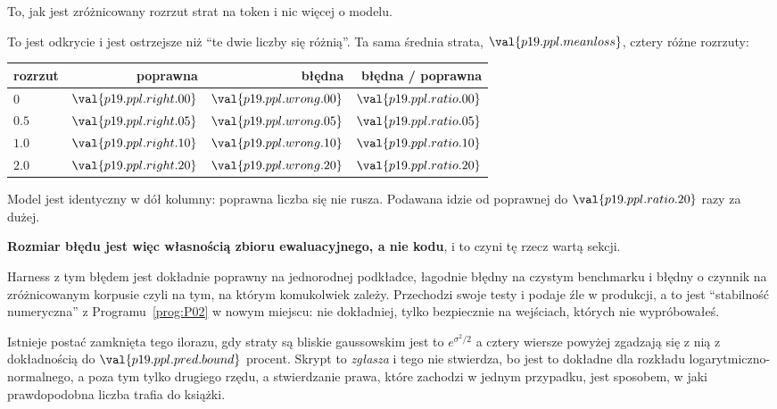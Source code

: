 \begin{fr}
\begin{ansblock}
To, jak jest zróżnicowany \dash{} rozrzut strat na token i nic więcej o
modelu.
\end{ansblock}

To jest odkrycie i jest ostrzejsze niż \enquote{te dwie liczby się różnią}. Ta
sama średnia strata, $\val{p19.ppl.meanloss}$, cztery różne rozrzuty:

\begin{center}
\begin{tabular}{lrrr}
\toprule
rozrzut & poprawna & błędna & błędna / poprawna \\
\midrule
$0$ & $\val{p19.ppl.right.00}$ & $\val{p19.ppl.wrong.00}$ & $\val{p19.ppl.ratio.00}$ \\
$\num{0.5}$ & $\val{p19.ppl.right.05}$ & $\val{p19.ppl.wrong.05}$ & $\val{p19.ppl.ratio.05}$ \\
$\num{1.0}$ & $\val{p19.ppl.right.10}$ & $\val{p19.ppl.wrong.10}$ & $\val{p19.ppl.ratio.10}$ \\
$\num{2.0}$ & $\val{p19.ppl.right.20}$ & $\val{p19.ppl.wrong.20}$ & $\val{p19.ppl.ratio.20}$ \\
\bottomrule
\end{tabular}
\end{center}

Model jest identyczny w dół kolumny: poprawna liczba się nie rusza. Podawana
idzie od poprawnej do $\val{p19.ppl.ratio.20}$ razy za dużej.

\end{fr}

\begin{fr}
\textbf{Rozmiar błędu jest więc własnością zbioru ewaluacyjnego, a nie kodu},
i to czyni tę rzecz wartą sekcji.

Harness z tym błędem jest dokładnie poprawny na jednorodnej podkładce, łagodnie
błędny na czystym benchmarku i błędny o czynnik na zróżnicowanym korpusie
\dash{} czyli na tym, na którym komukolwiek zależy. Przechodzi swoje testy i
podaje źle w produkcji, a to jest \enquote{stabilność numeryczna} z
Programu~\ref{prog:P02} w nowym miejscu: nie dokładniej, tylko bezpiecznie na
wejściach, których nie wypróbowałeś.

\begin{note}
Istnieje postać zamknięta tego ilorazu, gdy straty są bliskie gaussowskim
\dash{} jest to $e^{\sigma^{2}/2}$ \dash{} a cztery wiersze powyżej zgadzają
się z nią z dokładnością do $\val{p19.ppl.pred.bound}$ procent. Skrypt to
\emph{zgłasza} i tego nie stwierdza, bo jest to dokładne dla rozkładu
logarytmiczno-normalnego, a poza tym tylko drugiego rzędu, a stwierdzanie
prawa, które zachodzi w jednym przypadku, jest sposobem, w jaki prawdopodobna
liczba trafia do książki.
\end{note}
\end{fr}

